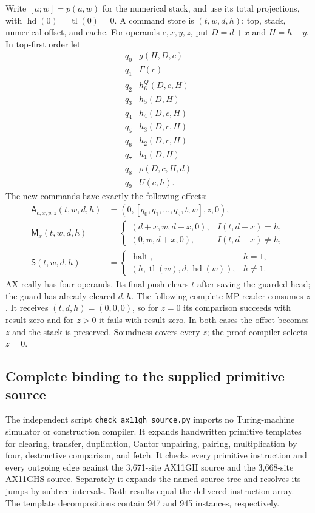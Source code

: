 Write $[a;w]=p(a,w)$ for the numerical stack, and use its total
projections, with $\operatorname{hd}(0)=\operatorname{tl}(0)=0$.
A command store is $(t,w,d,h)$: top, stack, numerical offset, and cache.
For operands $c,x,y,z$, put $D=d+x$ and $H=h+y$.  In top-first order let
\[
\begin{array}{c|l}
q_0&g(H,D,c)\\q_1&\Gamma(c)\\q_2&h_6^Q(D,c,H)\\q_3&h_5(D,H)\\
q_4&h_4(D,c,H)\\q_5&h_3(D,c,H)\\q_6&h_2(D,c,H)\\
q_7&h_1(D,H)\\q_8&\rho(D,c,H,d)\\q_9&U(c,h).
\end{array}
\]
The new commands have exactly the following effects:
\begin{align*}
 \mathsf A_{c,x,y,z}(t,w,d,h)
   &=(0,[q_0,q_1,\ldots,q_9,t;w],z,0),\\
 \mathsf M_x(t,w,d,h)
   &=\begin{cases}(d+x,w,d+x,0),&I(t,d+x)=h,\\
                   (0,w,d+x,0),&I(t,d+x)\ne h,\end{cases}\\
 \mathsf S(t,w,d,h)
   &=\begin{cases}\operatorname{halt},&h=1,\\
       (h,\operatorname{tl}(w),d,\operatorname{hd}(w)),&h\ne1.
       \end{cases}
                                                        \tag{GH}
\end{align*}
AX really has four operands.  Its final push clears $t$ after saving the
guarded head; the guard has already cleared $d,h$.  The following complete
MP reader consumes $z$.  It receives $(t,d,h)=(0,0,0)$, so for $z=0$
its comparison succeeds with result zero and for $z>0$ it fails with
result zero.  In both cases the offset becomes $z$ and the stack is
preserved.  Soundness covers every $z$; the proof compiler selects $z=0$.

\subsection{Complete binding to the supplied primitive source}

The independent script \texttt{check\_ax11gh\_source.py} imports no
Turing-machine simulator or construction compiler.  It expands handwritten
primitive templates for clearing, transfer, duplication, Cantor unpairing,
pairing, multiplication by four, destructive comparison, and fetch.
It checks every primitive instruction and every outgoing edge against the
3,671-site AX11GH source and the 3,668-site AX11GHS source.  Separately it expands the named source tree and
resolves its jumps by subtree intervals.  Both results equal the delivered
instruction array.  The template decompositions contain 947 and 945 instances, respectively.

